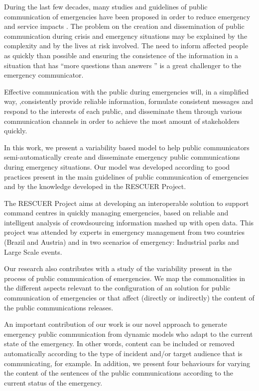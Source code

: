During the last few decades, many studies and guidelines of public communication of emergencies have been proposed in order to reduce emergency and service impacts  \citep{cdc2014}\citep{cisvGuide}\citep{panamericanhealthorganization2009}\citep{reynolds2007crisis}\citep{seeger2006best}\citep{tinker2010}. The problem on the creation and dissemination of public communication during crisis and emergency situations may be explained by the complexity and by the lives at risk involved. The need to inform affected people as quickly than possible and ensuring the consistence of the information in a situation that has ``more questions than answers \citep{cdc2014}'' is a great challenger to the emergency communicator.

 Effective communication with the public during emergencies will, in a simplified way, ,consistently provide reliable information, formulate consistent messages and respond to the interests of each public, and disseminate them through various communication channels in order to achieve the most amount of stakeholders quickly.

 In this work, we present a variability based model to help public communicators semi-automatically create and disseminate emergency public communications during emergency situations.  Our model was developed according to good practices present in the main guidelines of public communication of emergencies and by the knowledge developed in the RESCUER Project. 

The RESCUER Project aims at developing an interoperable solution to support command centres in quickly managing emergencies, based on reliable and intelligent analysis of crowdsourcing information mashed up with open data. This project was attended by experts in emergency management from two countries (Brazil and Austria) and in two scenarios of emergency: Industrial parks and Large Scale events.  

Our research also contributes with a study of the variability present in the process of public communication of emergencies. We map the commonalities in the different aspects relevant to the configuration of an solution for public communication of emergencies or that affect (directly or indirectly) the content of the public communications releases.

An important contribution of our work is our novel approach to generate emergency public communication from dynamic models who adapt to the current state of the emergency. In other words, content can be included or removed automatically according to the type of incident and/or target audience that is communicating, for example. In addition, we present four behaviours for varying the content of the sentences of the public communications according to the current status of the emergency.

